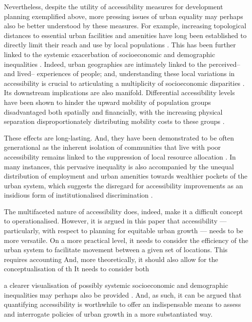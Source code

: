 Nevertheless, despite the utility of accessibility measures for development planning exemplified above, more pressing issues of urban equality may perhaps also be better understood by these measures. For example, increasing topological distances to essential urban facilities and amenities have long been established to directly limit their reach and use by local populations \citep{muraco1972intraurban}. This has been further linked to the systemic exacerbation of socioeconomic and demographic inequalities \citep{ewing2002measuring}. Indeed, urban geographies are intimately linked to the perceived-- and lived-- experiences of people; and, understanding these local variations in accessibility is crucial to articulating a multiplicity of socioeconomic disparities \citep{curl2011does}. Its downstream implications are also manifold. Differential accessibility levels have been shown to hinder the upward mobility of population groups disadvantaged both spatially and financially, with the increasing physical separation disproportionately distributing mobility costs to these groups \citep{ewing2016does}. 

These effects are long-lasting. And, they have been demonstrated to be often generational as the inherent isolation of communities that live with poor accessibility remains linked to the suppression of local resource allocation \citep{li2013residential}. In many instances, this pervasive inequality is also accompanied by the unequal distribution of employment and urban amenities towards wealthier pockets of the urban system, which suggests the disregard for accessibility improvements as an insidious form of institutionalised discrimination \citep{jencks1990residential,kneebone2015growing}.

The multifaceted nature of accessibility does, indeed, make it a difficult concept to operationalised. However, it is argued in this paper that accessibility --- particularly, with respect to planning for equitable urban growth --- needs to be more versatile. On a more practical level, it needs to consider the efficiency of the urban system to facilitate movement between a given set of locations. This requires accounting  And, more theoretically, it should also allow for the conceptualisation of th  It needs to consider both 

a clearer visualisation of possibly systemic socioeconomic and demographic inequalities may perhaps also be provided \citep{arapoglou2009new, fol2014social}. And, as such, it can be argued that quantifying accessibility is worthwhile to offer an indispensable means to assess and interrogate policies of urban growth in a more substantiated way. 

